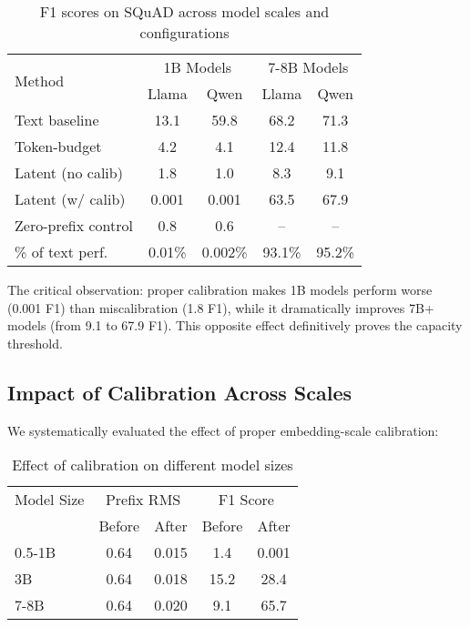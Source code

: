 \documentclass{article}
\begin{document}
\begin{table}[h]
\caption{F1 scores on SQuAD across model scales and configurations}
\label{tab:f1_scale_extended}
\vskip 0.15in
\begin{center}
\begin{small}
\begin{tabular}{lcccc}
\toprule
\multirow{2}{*}{Method} & \multicolumn{2}{c}{1B Models} & \multicolumn{2}{c}{7-8B Models} \\
& Llama & Qwen & Llama & Qwen \\
\midrule
Text baseline & 13.1 & 59.8 & 68.2 & 71.3 \\
Token-budget & 4.2 & 4.1 & 12.4 & 11.8 \\
Latent (no calib) & 1.8 & 1.0 & 8.3 & 9.1 \\
Latent (w/ calib) & 0.001 & 0.001 & 63.5 & 67.9 \\
Zero-prefix control & 0.8 & 0.6 & -- & -- \\
\midrule
\% of text perf. & 0.01\% & 0.002\% & 93.1\% & 95.2\% \\
\bottomrule
\end{tabular}
\end{small}
\end{center}
\vskip -0.1in
\end{table}

The critical observation: proper calibration makes 1B models perform worse (0.001 F1) than miscalibration (1.8 F1), while it dramatically improves 7B+ models (from 9.1 to 67.9 F1). This opposite effect definitively proves the capacity threshold.

\subsection{Impact of Calibration Across Scales}

We systematically evaluated the effect of proper embedding-scale calibration:

\begin{table}[h]
\caption{Effect of calibration on different model sizes}
\label{tab:calibration_effect}
\vskip 0.15in
\begin{center}
\begin{small}
\begin{tabular}{lcccc}
\toprule
Model Size & \multicolumn{2}{c}{Prefix RMS} & \multicolumn{2}{c}{F1 Score} \\
 & Before & After & Before & After \\
\midrule
0.5-1B & 0.64 & 0.015 & 1.4 & 0.001 \\
3B & 0.64 & 0.018 & 15.2 & 28.4 \\
7-8B & 0.64 & 0.020 & 9.1 & 65.7 \\
\bottomrule
\end{tabular}
\end{small}
\end{center}
\vskip -0.1in
\end{table}
\end{document}

